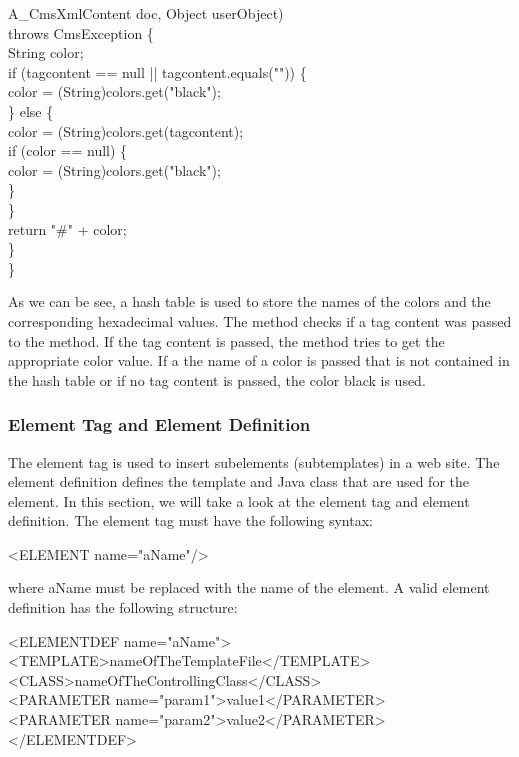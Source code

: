 \begin{java}
\jtabd            A\_CmsXmlContent doc, Object userObject)\\
\jtabd            throws CmsException \{\\
\jtabc        String color;\\
\jtabc        if (tagcontent == null || tagcontent.equals("")) \{\\
\jtabd            color = (String)colors.get("black");\\
\jtabc        \} else \{\\
\jtabd            color = (String)colors.get(tagcontent);\\
\jtabd            if (color == null) \{\\
\jtabd                color = (String)colors.get("black");\\
\jtabd            \}\\
\jtabc        \}\\
\jtabc        return "\#" + color;\\
\jtabb    \}\\
\}\\
\end{java}

As we can be see, a hash table is used to store the names of the colors
and the corresponding hexadecimal values. The method checks if a tag
content was passed to the method. If the tag content is passed, the
method tries to get the appropriate color value. If a the name of a
color is passed that is not contained in the hash table or if no tag
content is passed, the color black is used.

\subsubsection{Element Tag and Element Definition}
The element tag is used to insert subelements (subtemplates) in a web
site. The element definition defines the template and Java class that
are used for the element. In this section, we will take a look at the element tag
and element definition. The element tag must have the following syntax:

{\tag <ELEMENT name="aName"/>}

where {\name aName} must be replaced with the name of the element. A valid
element definition has the following structure:

\begin{xml}
<ELEMENTDEF name="aName">\\
<TEMPLATE>nameOfTheTemplateFile</TEMPLATE>\\
<CLASS>nameOfTheControllingClass</CLASS>\\
<PARAMETER name="param1">value1</PARAMETER>\\
<PARAMETER name="param2">value2</PARAMETER>\\
</ELEMENTDEF>\\
\end{xml}

